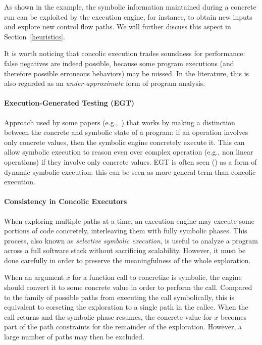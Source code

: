 \noindent As shown in the example, the symbolic information maintained during a concrete run can be exploited by the execution engine, for instance, to obtain new inputs and explore new control flow paths. We will further discuss this aspect in Section~\ref{heuristics}. 

It is worth noticing that concolic execution trades soundness for performance: false negatives are indeed possible, because some program executions (and therefore possible erroneous behaviors) may be missed. In the literature, this is also regarded as an {\em under-approximate} form of program analysis.

\bigskip

\paragraph{Execution-Generated Testing (EGT)} 
 Approach used by some papers (e.g.,~\cite{KLEE-OSDI08,EXE-CCS06}) that works by making a distinction between the concrete and symbolic state of a program: if an operation involves only concrete values, then the symbolic engine concretely execute it. This can allow symbolic execution to reason even over complex operation (e.g., non linear operations) if they involve only concrete values. EGT is often seen (\cite{CS-CACM13}) as a form of dynamic symbolic execution: this can be seen as more general term than concolic execution.

\paragraph{Consistency in Concolic Executors}  %

When exploring multiple paths at a time, an execution engine may execute some portions of code concretely, interleaving them with fully symbolic phases. This process, also known as {\em selective symbolic execution}, is useful to analyze a program across a full software stack without sacrificing scalability. However, it must be done carefully in order to preserve the meaningfulness of the whole exploration.

When an argument $x$ for a function call to concretize is symbolic, the engine should convert it to some concrete value in order to perform the call. Compared to the family of possible paths from executing the call symbolically, this is equivalent to corseting the exploration to a single path in the callee. When the call returns and the symbolic phase resumes, the concrete value for $x$ becomes part of the path constraints for the remainder of the exploration. However, a large number of paths may then be excluded.

